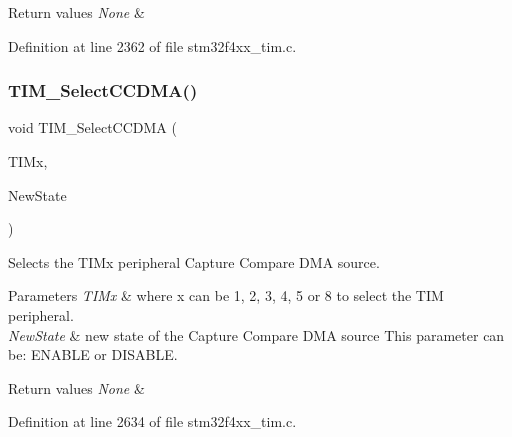\begin{DoxyRetVals}{Return values}
{\em None} & \\
\hline
\end{DoxyRetVals}


Definition at line 2362 of file stm32f4xx\+\_\+tim.\+c.

\mbox{\label{group___t_i_m___group5_ga5273cb65acb885fe7982827b1c6b7d75}} 
\subsubsection{\texorpdfstring{T\+I\+M\+\_\+\+Select\+C\+C\+D\+M\+A()}{TIM\_SelectCCDMA()}}
{\footnotesize\ttfamily void T\+I\+M\+\_\+\+Select\+C\+C\+D\+MA (\begin{DoxyParamCaption}\item[{\hyperlink{struct_t_i_m___type_def}{T\+I\+M\+\_\+\+Type\+Def} $\ast$}]{T\+I\+Mx,  }\item[{Functional\+State}]{New\+State }\end{DoxyParamCaption})}



Selects the T\+I\+Mx peripheral Capture Compare D\+MA source. 


\begin{DoxyParams}{Parameters}
{\em T\+I\+Mx} & where x can be 1, 2, 3, 4, 5 or 8 to select the T\+IM peripheral. \\
\hline
{\em New\+State} & new state of the Capture Compare D\+MA source This parameter can be\+: E\+N\+A\+B\+LE or D\+I\+S\+A\+B\+LE. \\
\hline
\end{DoxyParams}

\begin{DoxyRetVals}{Return values}
{\em None} & \\
\hline
\end{DoxyRetVals}


Definition at line 2634 of file stm32f4xx\+\_\+tim.\+c.

